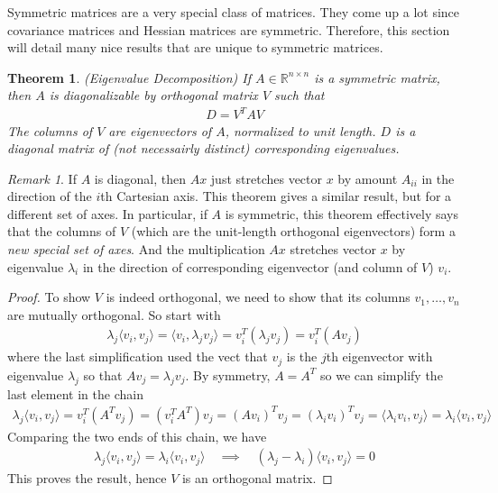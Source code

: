 \documentclass[12pt]{article}
\numberwithin{equation}{section} %
\theoremstyle{plain}
\newtheorem{thm}{Theorem}[section]
\theoremstyle{definition}
\theoremstyle{remark}
\newtheorem*{rmk}{Remark}
\newcommand{\Rnn}{\mathbb{R}^{n\times n}}
\begin{document}
Symmetric matrices are a very special class of matrices. They come up a
lot since covariance matrices and Hessian matrices are symmetric.
Therefore, this section will detail many nice results that are unique to
symmetric matrices.

\begin{thm}\emph{(Eigenvalue Decomposition)}
\label{thm:symmetric-diag}
If $A\in\Rnn$ is a symmetric matrix, then $A$ is
diagonalizable by orthogonal matrix $V$ such that
\begin{align*}
  D = V^T A V
\end{align*}
The columns of $V$ are eigenvectors of $A$, normalized to unit length.
$D$ is a diagonal matrix of (not necessairly distinct) corresponding
eigenvalues.
\end{thm}
\begin{rmk}
If $A$ is diagonal, then $Ax$ just stretches vector $x$ by amount
$A_{ii}$ in the direction of the $i$th Cartesian axis.
This theorem gives a similar result, but for a different set of axes.
In particular, if $A$ is symmetric, this theorem effectively says that
the columns of $V$ (which are the unit-length orthogonal eigenvectors)
form a \emph{new special set of axes}. And the multiplication $Ax$
stretches vector $x$ by eigenvalue $\lambda_i$ in the direction of
corresponding eigenvector (and column of $V$) $v_i$.
\end{rmk}
\begin{proof}
To show $V$ is indeed orthogonal, we need to show that its columns
$v_1,\ldots,v_n$ are mutually orthogonal. So start with
\begin{align*}
  \lambda_j \langle v_i, v_j \rangle
  =
  \langle v_i, \lambda_j v_j \rangle
  = v_i^T (\lambda_j v_j)
  = v_i^T (A v_j)
\end{align*}
where the last simplification used the vect that $v_j$ is the $j$th
eigenvector with eigenvalue $\lambda_j$ so that $Av_j=\lambda_j v_j$.
By symmetry, $A=A^T$ so we can simplify the last element in the chain
\begin{align*}
  \lambda_j \langle v_i, v_j \rangle
  = v_i^T (A^T v_j)
  = (v_i^T A^T) v_j
  = (Av_i)^T v_j
  = (\lambda_i v_i)^T v_j
  = \langle \lambda_i v_i, v_j \rangle
  = \lambda_i \langle v_i, v_j \rangle
\end{align*}
Comparing the two ends of this chain, we have
\begin{align*}
  \lambda_j \langle v_i, v_j \rangle
  = \lambda_i \langle v_i, v_j \rangle
  \quad\implies\quad
  (\lambda_j-\lambda_i) \langle v_i, v_j \rangle
  = 0
\end{align*}
This proves the result, hence $V$ is an orthogonal matrix.
\end{proof}
\end{document}
